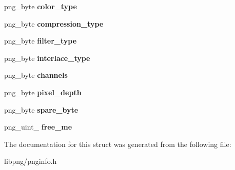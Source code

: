 \begin{DoxyCompactItemize}
\item 
\hypertarget{structpng__info__def_aa89dde7a6d87c229e9a4d6313fb4537b}{png\-\_\-byte {\bfseries color\-\_\-type}}\label{structpng__info__def_aa89dde7a6d87c229e9a4d6313fb4537b}

\item 
\hypertarget{structpng__info__def_ab282a14aee6f0e080a7a4399b412fd20}{png\-\_\-byte {\bfseries compression\-\_\-type}}\label{structpng__info__def_ab282a14aee6f0e080a7a4399b412fd20}

\item 
\hypertarget{structpng__info__def_aa9a869f34f99f9d02e476892e68a26ea}{png\-\_\-byte {\bfseries filter\-\_\-type}}\label{structpng__info__def_aa9a869f34f99f9d02e476892e68a26ea}

\item 
\hypertarget{structpng__info__def_afad8a12cf463fed8ab5fe29e3d85b6c1}{png\-\_\-byte {\bfseries interlace\-\_\-type}}\label{structpng__info__def_afad8a12cf463fed8ab5fe29e3d85b6c1}

\item 
\hypertarget{structpng__info__def_ab0bafa25f05331940beb673783b1fac8}{png\-\_\-byte {\bfseries channels}}\label{structpng__info__def_ab0bafa25f05331940beb673783b1fac8}

\item 
\hypertarget{structpng__info__def_ab98a44dd6a8e1c0258019469c77ffa2b}{png\-\_\-byte {\bfseries pixel\-\_\-depth}}\label{structpng__info__def_ab98a44dd6a8e1c0258019469c77ffa2b}

\item 
\hypertarget{structpng__info__def_a09cbd4c9a9727499a9e2deba0a8e9134}{png\-\_\-byte {\bfseries spare\-\_\-byte}}\label{structpng__info__def_a09cbd4c9a9727499a9e2deba0a8e9134}

\item 
\hypertarget{structpng__info__def_a80f147934033ea3c3da1addd182b7ef3}{png\-\_\-uint\-\_ {\bfseries free\-\_\-me}}\label{structpng__info__def_a80f147934033ea3c3da1addd182b7ef3}

\end{DoxyCompactItemize}


The documentation for this struct was generated from the following file\-:\begin{DoxyCompactItemize}
\item 
libpng/pnginfo.\-h\end{DoxyCompactItemize}
